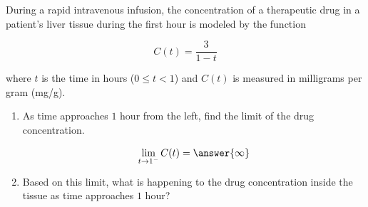 \documentclass{ximera}
\begin{document}
\begin{problem}
During a rapid intravenous infusion, the concentration of a therapeutic drug in a patient's liver tissue during the first hour 
is modeled by the function

\[ C(t) = \frac{3}{1 - t} \]

where $t$ is the time in hours ($0 \leq t < 1$) and $C(t)$ is measured in milligrams per gram (mg/g).

\begin{enumerate}
\item As time approaches $1$ hour from the left, find the limit of the drug concentration.

\[ \lim_{t \to 1^-} C(t) = \answer{\infty} \]

\item Based on this limit, what is happening to the drug concentration inside the tissue as time approaches $1$ hour?

\begin{multipleChoice}
\end{multipleChoice}

\end{enumerate}
\end{problem}
\end{document}

